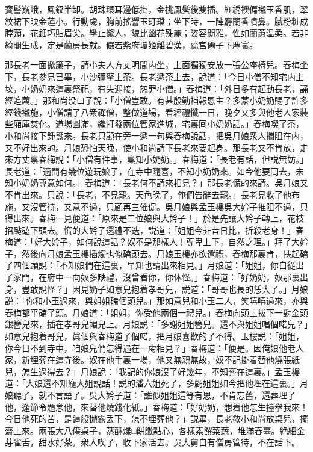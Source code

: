 \begin{myquote}
寳髻巍峨，鳳釵半卸。胡珠環耳邊低掛，金挑鳳鬢後雙插。紅綉襖偏襯玉香肌，翠紋裙下映金蓮小。行動䖏，胸前搖響玉玎璫；坐下時，一陣麝蘭香噴鼻。膩粉粧成脖頸，花鈿巧貼眉尖。擧止驚人，貌比幽花殊麗；姿容閒雅，性如蘭蕙温柔。若非綺閣生成，定是蘭房長就。儼若紫府瓊姬離碧漢，蕊宫僊子下塵寰。
\end{myquote}

那長老一面掀簾子，請小夫人方丈明間内坐，上面獨獨安放一張公座椅兒。春梅坐下，長老參見已畢，小沙彌拏上茶。長老遞茶上去，說道：「今日小僧不知宅内上坟，小奶奶來這裏祭祀，有失迎接，恕罪小僧。」春梅道：「外日多有起動長老，誦經追薦。」那和尚没口子說：「小僧豈敢。有甚殷勤補報恩主？多蒙小奶奶賜了許多經錢襯施，小僧請了八衆禪僧，整做道場，看經禮懺一日，晚夕又多與他老人家裝些廂庫焚化。道場圓滿，纔打發兩位管家進城，宅裏囘小奶奶話。」春梅喫了茶，小和尚接下鍾盞來。長老只顧在旁一遞一句與春梅說話，把吳月娘衆人攔阻在内，又不好出來的。月娘恐怕天晚，使小和尚請下長老來要起身。那長老又不肯放，走來方丈禀春梅說：「小僧有件事，稟知小奶奶。」春梅道：「長老有話，但説無妨。」長老道：「適間有幾位遊玩娘子，在寺中隨喜，不知小奶奶來。如今他要囘去，未知小奶奶尊意如何。」春梅道：「長老何不請來相見？」那長老慌的來請。吳月娘又不肯出來。只說：「長老，不見罷。天色晚了，俺們告辭去罷。」長老見收了他布施，又沒管待，又意不過，只顧再三催促。吳月娘與孟玉樓吳大妗子推阻不過，只得出來。春梅一見便道：「原來是二位娘與大妗子！」於是先讓大妗子轉上，花枝招颭磕下頭去。慌的大妗子還禮不迭，説道：「姐姐今非昔日比，折殺老身！」春梅道：「好大妗子，如何說這話？奴不是那樣人！尊卑上下，自然之理。」拜了大妗子，然後向月娘孟玉樓插燭也似磕頭去。月娘玉樓亦欲還禮，春梅那裏肯，扶起磕了四個頭說：「不知娘們在這裏，早知也請出來相見。」月娘道：「姐姐，你自従出了家門，在府中一向奴多缺禮，沒曾看你，你休怪。」春梅道：「好奶奶，奴那裏出身，豈敢說怪？」因見奶子如意兒抱着孝哥兒，説道：「哥哥也長的恁大了。」月娘説：「你和小玉過來，與姐姐磕個頭兒。」那如意兒和小玉二人，笑嘻嘻過來，亦與春梅都平磕了頭。月娘道：「姐姐，你受他兩個一禮兒。」春梅向頭上拔下一對金頭銀簪兒來，插在孝哥兒帽兒上。月娘説：「多謝姐姐簪兒。還不與姐姐唱個喏兒？」如意兒抱着哥兒，眞個與春梅道了個喏，把月娘喜歡的了不得。玉樓説：「姐姐，你今日不到寺中，咱娘兒們怎得遇在一䖏相見？」春梅道：「便是。因俺娘他老人家，新埋葬在這寺後。奴在他手裏一場，他又無親無故，奴不記掛着替他燒張紙兒，怎生過得去？」月娘說：「我記的你娘沒了好幾年，不知葬在這裏。」孟玉樓道：「大娘還不知龐大姐說話！説的潘六姐死了，多虧姐姐如今把他埋在這裏。」月娘聽了，就不言語了。吳大妗子道：「誰似姐姐這等有恩，不肯忘舊，還葬埋了他，逢節令題念他，來替他燒錢化紙。」春梅道：「好奶奶，想着他怎生擡擧我來！今日他死的苦，是這般抛露丢下，怎不埋葬他？」説畢，長老敎小和尚放桌兒，擺齋上來。兩張大八僊桌子，蒸酥煠□餅饊點心，各樣素饌菜蔬，堆滿春臺。絶細金芽雀舌，甜水好茶。衆人喫了，收下家活去。吳大舅自有僧房管待，不在話下。

